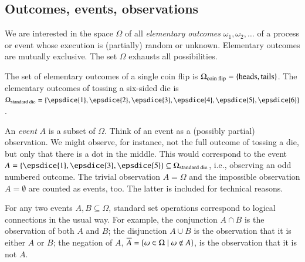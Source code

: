 \documentclass[nobib,nofonts]{tufte-handout}
\renewcommand{\markdef}[1]{\emph{#1}}
\begin{document}
\subsection{Outcomes, events, observations}

We are interested in the space $\Omega$ of all \markdef{elementary outcomes} $\omega_1,
\omega_2, \dots$ of a process or event whose execution is (partially) random or
unknown. Elementary outcomes are mutually exclusive. The set $\Omega$ exhausts all
possibilities.

\begin{example}
  The set of elementary outcomes of a single coin flip is $\Omega_{\text{coin flip}} =
  \left\{\text{heads}, \text{tails}\right\}$. The elementary outcomes of tossing a six-sided die is
  $\Omega_{\text{standard die}} = \set{\epsdice{1}, \epsdice{2}, \epsdice{3}, \epsdice{4},
    \epsdice{5}, \epsdice{6}}$.
\end{example}

An \markdef{event} $A$ is a subset of $\Omega$. Think of an event as a (possibly partial)
observation. We might observe, for instance, not the full outcome of tossing a die, but only
that there is a dot in the middle. This would correspond to the event
$A = \set{\epsdice{1}, \epsdice{3}, \epsdice{5}} \subseteq \Omega_{\text{standard die}}$,
i.e., observing an odd numbered outcome. The trivial observation $A = \Omega$ and the
impossible observation $A = \emptyset$ are counted as events, too. The latter is included for
technical reasons.


For any two events $A, B \subseteq \Omega$, standard set operations correspond to logical
connections in the usual way. For example, the conjunction $A \cap B$ is the observation of
both $A$ and $B$; the disjunction $A \cup B$ is the observation that it is either $A$ or $B$;
the negation of $A$, $\overline{A} = \left\{\omega \in \Omega \mid \omega \not \in A\right\}$, is the
observation that it is not $A$.
\end{document}
